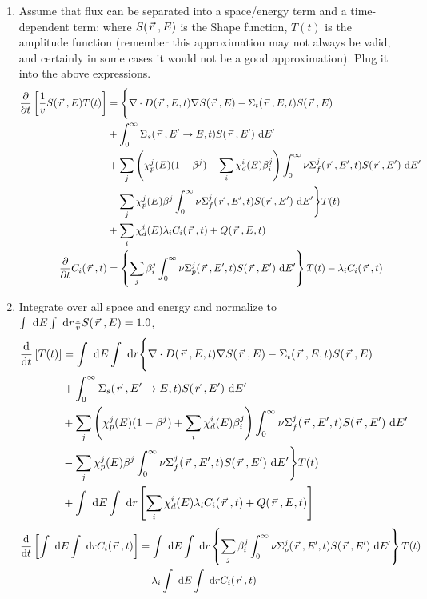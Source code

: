 \documentclass{school-22.211-notes}
\begin{document}
\begin{enumerate}
\item Assume that flux can be separated into a space/energy term and a time-dependent term: 
where $S(\left.\vec{r}\right., E)$ is the Shape function,  $T(t)$ is the amplitude function (remember this approximation may not always be valid, and certainly in some cases it would not be a good approximation). Plug it into the above expressions. 
  \begin{align}
    \frac{\partial}{\partial t} \left[ \frac{1}{v} S(\left.\vec{r}\right., E) T(t) \right] &= 
    \Bigg\{ \nabla \cdot D(\left.\vec{r}\right., E, t) \nabla S(\left.\vec{r}\right., E) - \Sigma_t (\left.\vec{r}\right., E, t) S(\left.\vec{r}\right., E)   \notag \\
    & + \int_0^{\infty} \Sigma_s (\left.\vec{r}\right., E'\to E, t) S(\left.\vec{r}\right., E') \mbox{ }\mathrm{d} E'   \notag \\
    &+ \displaystyle\sum_j \left( \chi_p^j (E) (1-\beta^j) + \displaystyle\sum_i \chi_d^i (E) \beta_i^j \right) \int_0^{\infty} \nu \Sigma_f^j (\left.\vec{r}\right., E', t) S(\left.\vec{r}\right., E') \mbox{ }\mathrm{d} E'   \notag \\
    &- \displaystyle\sum_j \chi_p^j (E) \beta^j \int_0^{\infty} \nu \Sigma_f^j (\left.\vec{r}\right., E', t) S(\left.\vec{r}\right., E') \mbox{ }\mathrm{d} E' \Bigg\} T(t)  \notag \\
    &+ \displaystyle\sum_i \chi_d^i (E) \lambda_i C_i (\left.\vec{r}\right., t) + Q(\left.\vec{r}\right., E, t)   \\
    \frac{\partial}{\partial t} C_i (\left.\vec{r}\right., t) &= \left\{ \displaystyle\sum_j \beta_i^j \int_0^{\infty} \nu \Sigma_p^j (\left.\vec{r}\right., E', t) S(\left.\vec{r}\right., E') \mbox{ }\mathrm{d} E' \right\} T(t) - \lambda_i C_i (\left.\vec{r}\right., t) 
  \end{align}


\item Integrate over all space and energy and normalize to $\int \mbox{ }\mathrm{d} E \int \mbox{ }\mathrm{d} r \frac{1}{v} S(\left.\vec{r}\right., E) = 1.0$, 
  \begin{align}
    \frac{\mathrm{d}}{\mathrm{d}t} \left[ T(t) \right] &= 
    \int \mbox{ }\mathrm{d} E \int \mbox{ }\mathrm{d} r \Bigg\{ \nabla \cdot D(\left.\vec{r}\right., E, t) \nabla S(\left.\vec{r}\right., E) - \Sigma_t (\left.\vec{r}\right., E, t) S(\left.\vec{r}\right., E)   \notag \\
    & + \int_0^{\infty} \Sigma_s (\left.\vec{r}\right., E'\to E, t) S(\left.\vec{r}\right., E') \mbox{ }\mathrm{d} E'   \notag \\
    &+ \displaystyle\sum_j \left( \chi_p^j (E) (1-\beta^j) + \displaystyle\sum_i \chi_d^i (E) \beta_i^j \right) \int_0^{\infty} \nu \Sigma_f^j (\left.\vec{r}\right., E', t) S(\left.\vec{r}\right., E') \mbox{ }\mathrm{d} E'   \notag \\
    &- \displaystyle\sum_j \chi_p^j (E) \beta^j \int_0^{\infty} \nu \Sigma_f^j (\left.\vec{r}\right., E', t) S(\left.\vec{r}\right., E') \mbox{ }\mathrm{d} E' \Bigg\} T(t)  \notag \\
    &+ \int \mbox{ }\mathrm{d} E \int \mbox{ }\mathrm{d} r \left[ \displaystyle\sum_i \chi_d^i (E) \lambda_i C_i (\left.\vec{r}\right., t) + Q(\left.\vec{r}\right., E, t)\right]   \label{PKE-1}
  \end{align}
  \begin{align}
    \frac{\mathrm{d}}{\mathrm{d}t} \left[ \int \mbox{ }\mathrm{d} E \int \mbox{ }\mathrm{d} r C_i (\left.\vec{r}\right., t) \right] &= \int \mbox{ }\mathrm{d} E \int \mbox{ }\mathrm{d} r \left\{ \displaystyle\sum_j \beta_i^j \int_0^{\infty} \nu \Sigma_p^j (\left.\vec{r}\right., E', t) S(\left.\vec{r}\right., E') \mbox{ }\mathrm{d} E' \right\} T(t) \notag \\
    &- \lambda_i \int \mbox{ }\mathrm{d} E \int \mbox{ }\mathrm{d} r C_i (\left.\vec{r}\right., t)  \label{PKE-2}
  \end{align}



\end{enumerate}
\end{document}
